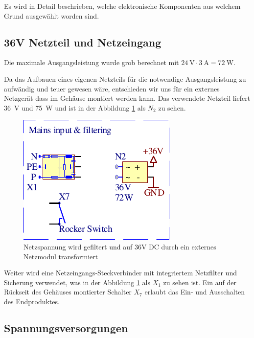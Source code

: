 Es wird  in  Detail  beschrieben,  welche  elektronische Komponenten aus welchem
Grund ausgew\"ahlt worden sind.

\subsection{36V Netzteil und Netzeingang}

Die  maximale Ausgangsleistung wurde grob berechnet  mit  $\SI{24}{\volt}  \cdot
\SI{3}{\ampere} = \SI{72}{\watt}$.

Da das Aufbauen eines eigenen Netzteils f\"ur die notwendige Ausgangsleistung zu
aufw\"andig und  teuer  gewesen  w\"are,  entschieden wir uns f\"ur ein externes
Netzger\"at  dass  im  Geh\"ause  montiert werden kann. Das verwendete  Netzteil
liefert   \SI{36}{\volt}   und   \SI{75}{\watt}  und  ist   in   der   Abbildung
\ref{fig:circuit:mains-input} als $N_2$ zu sehen.

\begin{figure}[th!]
    \center
    \includegraphics[width=.35\textwidth]{images/circuit/mains-input.pdf}
    \caption{Netzspannung wird gefiltert und auf 36V DC durch ein externes Netzmodul transformiert}
    \label{fig:circuit:mains-input}
\end{figure}

Weiter  wird  eine  Netzeingangs-Steckverbinder  mit integriertem Netzfilter und
Sicherung  verwendet,  was  in der Abbildung  \ref{fig:circuit:mains-input}  als
$X_1$  zu  sehen  ist. Ein auf der R\"uckseit des Geh\"auses montierter Schalter
$X_7$ erlaubt das Ein- und Ausschalten des Endproduktes.

\subsection{Spannungsversorgungen}

